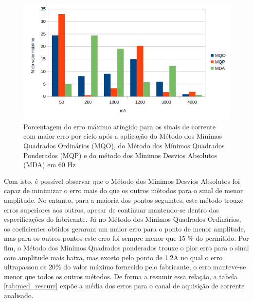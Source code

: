 \begin{figure}
    \caption{Porcentagem do erro máximo atingido para os sinais de corrente com maior erro por ciclo após a aplicação do Método dos Mínimos Quadrados Ordinários (MQO), do Método dos Mínimos Quadrados Ponderados (MQP) e do método dos Mínimos Desvios Absolutos (MDA) em 60 Hz}
    \label{fig:res_curr}
    \centering
    \includegraphics[width=0.9\linewidth]{pictures/max_err_A_aftercalib.png}
\end{figure}

Com isto, é possível observar que o Método dos Mínimos Desvios Absolutos foi capaz de minimizar o erro mais do que os outros métodos para o sinal de menor amplitude. No entanto, para a maioria dos pontos seguintes, este método trouxe erros superiores aos outros, apesar de continuar mantendo-se dentro das especificações do fabricante. Já no Método dos Mínimos Quadrados Ordinários, os coeficientes obtidos geraram um maior erro para o ponto de menor amplitude, mas para os outros pontos este erro foi sempre menor que 15 \% do permitido. Por fim, o Método dos Mínimos Quadrados ponderados trouxe o pior erro para o sinal com amplitude mais baixa, mas exceto pelo ponto de 1.2A no qual o erro ultrapassou os 20\% do valor máximo fornecido pelo fabricante, o erro manteve-se menor que todos os outros métodos. De forma a resumir essa relação, a tabela \ref{tab:med_rescurr} expõe a média dos erros para o canal de aquisição de corrente analisado.

\begin{table}[htb]
\end{table}

